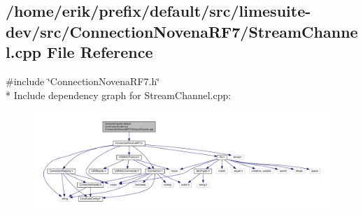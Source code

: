 \subsection{/home/erik/prefix/default/src/limesuite-\/dev/src/\+Connection\+Novena\+R\+F7/\+Stream\+Channel.cpp File Reference}
\label{StreamChannel_8cpp}
{\ttfamily \#include \char`\"{}Connection\+Novena\+R\+F7.\+h\char`\"{}}\\*
Include dependency graph for Stream\+Channel.\+cpp\+:
\nopagebreak
\begin{figure}[H]
\begin{center}
\leavevmode
\includegraphics[width=350pt]{d3/de6/StreamChannel_8cpp__incl}
\end{center}
\end{figure}
